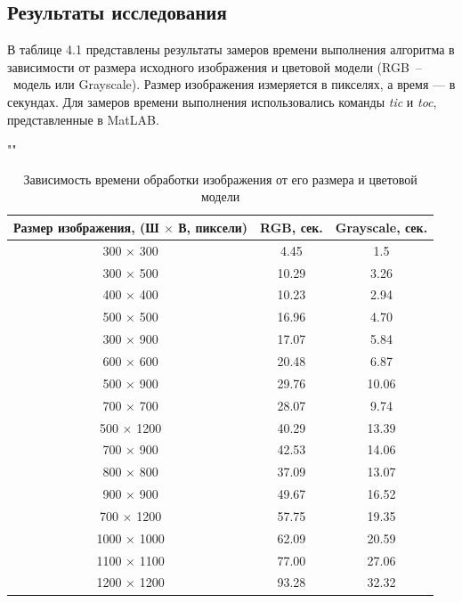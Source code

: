 \subsection*{Результаты исследования}

В таблице 4.1 представлены результаты замеров времени выполнения алгоритма в зависимости от размера исходного изображения и цветовой модели (RGB~--~модель или Grayscale). Размер изображения измеряется в пикселях, а время --- в секундах. Для замеров времени выполнения использовались команды \textit{tic} и \textit{toc}, представленные в MatLAB.

\renewcommand{\arraystretch}{1.5}
\begin{table}[h!]
	\begin{center}
		\caption{Зависимость времени обработки изображения от его размера и цветовой модели}
		""\newline
		\label{tabl}
		\begin{tabular}{ |c|c|c| } 
			\hline
			\textbf{Размер изображения}, (Ш $\times$ В, пиксели) & \textbf{RGB}, сек. & \textbf{Grayscale}, сек.\\
			\hline
			300 $\times$ 300 & 4.45 & 1.5\\
			\hline
			300 $\times$ 500 & 10.29 & 3.26\\
			\hline
			400 $\times$ 400 & 10.23 & 2.94\\
			\hline
			500 $\times$ 500 & 16.96 & 4.70\\
			\hline
			300 $\times$ 900 & 17.07 & 5.84\\
			\hline
			600 $\times$ 600 & 20.48 & 6.87\\
			\hline
			500 $\times$ 900 & 29.76 & 10.06\\
			\hline
			700 $\times$ 700 & 28.07 & 9.74\\
			\hline
			500 $\times$ 1200 & 40.29 & 13.39\\
			\hline
			700 $\times$ 900 & 42.53 & 14.06\\
			\hline
			800 $\times$ 800 & 37.09 & 13.07\\
			\hline
			900 $\times$ 900 & 49.67 & 16.52\\
			\hline
			700 $\times$ 1200 & 57.75 & 19.35\\
			\hline
			1000 $\times$ 1000 & 62.09 & 20.59\\
			\hline
			1100 $\times$ 1100 & 77.00 & 27.06\\
			\hline
			1200 $\times$ 1200 & 93.28 & 32.32\\
			\hline
		\end{tabular}
	\end{center}
\end{table}

